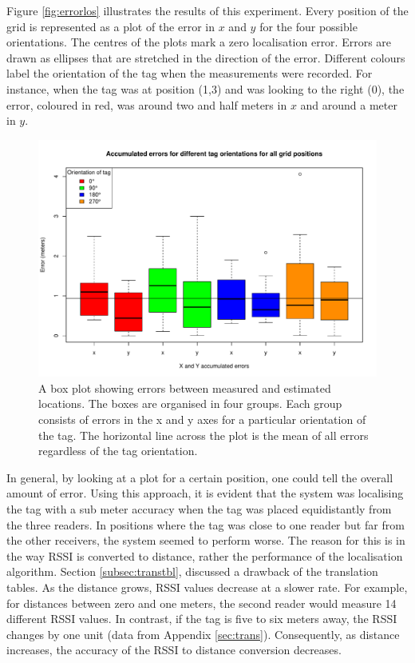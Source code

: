 Figure \ref{fig:errorlos} illustrates the results of this experiment. Every position of the grid is represented as a plot of the error in $x$ and $y$ for the four possible orientations. The centres of the plots mark a zero localisation error. Errors are drawn as ellipses that are stretched in the direction of the error. Different colours label the orientation of the tag when the measurements were recorded. For instance, when the tag was at position (1,3) and was looking to the right (0\textdegree), the error, coloured in red, was around two and half meters in $x$ and around a meter in $y$. 
\begin{figure}[H]
	\begin{center}
		\includegraphics[width=.8\textwidth]{figures/error_boxplot}
		\caption{A box plot showing errors between measured and estimated locations. The boxes are organised in four groups. Each group consists of errors in the x and y axes for a particular orientation of the tag. The horizontal line across the plot is the mean of all errors regardless of the tag orientation.}
		\label{fig:errorlosbox}
	\end{center}
\end{figure}

In general, by looking at a plot for a certain position, one could tell the overall amount of error. Using this approach, it is evident that the system was localising the tag with a sub meter accuracy when the tag was placed equidistantly from the three readers. In positions where the tag was close to one reader but far from the other receivers, the system seemed to perform worse. The reason for this is in the way RSSI is converted to distance, rather the performance of the localisation algorithm. Section \ref{subsec:transtbl}, discussed a drawback of the translation tables. As the distance grows, RSSI values decrease at a slower rate. For example, for distances between zero and one meters, the second reader would measure 14 different RSSI values. In contrast, if the tag is five to six meters away, the RSSI changes by one unit (data from Appendix \ref{sec:trans}). Consequently, as distance increases, the accuracy of the RSSI to distance conversion decreases.

